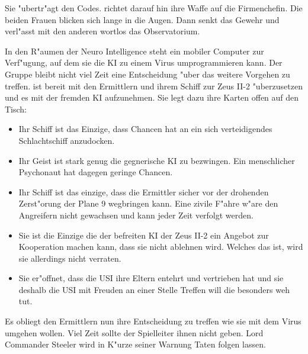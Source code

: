 Sie "ubertr"agt \ml{} den Codes. \xl{} richtet darauf hin ihre Waffe auf die Firmenchefin. Die beiden Frauen blicken sich lange in die Augen. Dann senkt \xl{} das Gewehr und verl"asst mit den anderen wortlos das Observatorium.

In den R"aumen der Neuro Intelligence steht \ml{} ein mobiler Computer zur Verf"ugung, auf dem sie die KI zu einem Virus umprogrammieren kann. Der Gruppe bleibt nicht viel Zeit eine Entscheidung "uber das weitere Vorgehen zu treffen. \xl{} ist bereit mit den Ermittlern und ihrem Schiff zur Zeus II-2 "uberzusetzen und es mit der fremden KI aufzunehmen. Sie legt dazu ihre Karten offen auf den Tisch:

\begin{itemize}
	\item Ihr Schiff ist das Einzige, dass Chancen hat an ein sich verteidigendes Schlachtschiff anzudocken.
	\item Ihr Geist ist stark genug die gegnerische KI zu bezwingen. Ein menschlicher Psychonaut hat dagegen geringe Chancen.
	\item Ihr Schiff ist das einzige, dass die Ermittler sicher vor der drohenden Zerst"orung der Plane 9 wegbringen kann. Eine zivile F"ahre 
        w"are den Angreifern nicht gewachsen und kann jeder Zeit verfolgt werden.
	\item Sie ist die Einzige die der befreiten KI der Zeus II-2 ein Angebot zur Kooperation machen kann, dass sie nicht ablehnen wird. 
		Welches das ist, wird sie allerdings nicht verraten.
    \item Sie er"offnet, dass die USI ihre Eltern entehrt und vertrieben hat und sie deshalb die USI mit Freuden an einer Stelle Treffen 
        will die besonders weh tut.
\end{itemize}

Es obliegt den Ermittlern nun ihre Entscheidung zu treffen wie sie mit dem Virus umgehen wollen. Viel Zeit sollte der Spielleiter ihnen nicht geben. Lord Commander Steeler wird in K"urze seiner Warnung Taten folgen lassen.

\vfill
\newpage

